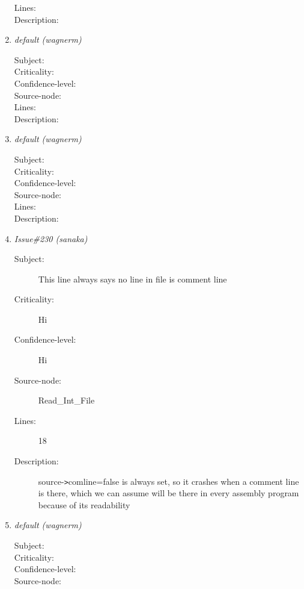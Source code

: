 \begin{enumerate}
\begin{description}
\item [Lines:] 

\item [Description:] 
\end{description}
\item {\it default (wagnerm)}
\begin{description}
\item [Subject:] 
\item [Criticality:] 
\item [Confidence-level:] 
\item [Source-node:] 

\item [Lines:] 

\item [Description:] 
\end{description}
\item {\it default (wagnerm)}
\begin{description}
\item [Subject:] 
\item [Criticality:] 
\item [Confidence-level:] 
\item [Source-node:] 

\item [Lines:] 

\item [Description:] 
\end{description}
\item {\it Issue\#230 (sanaka)}
\begin{description}
\item [Subject:] This line always says no line in file is comment line
\item [Criticality:] Hi
\item [Confidence-level:] Hi
\item [Source-node:] Read\_Int\_File

\item [Lines:] 18

\item [Description:] source-{\tt >}comline=false is always set, so it
crashes when a comment line is there, which we can assume will be there in
every assembly program because of its readability
\end{description}
\item {\it default (wagnerm)}
\begin{description}
\item [Subject:] 
\item [Criticality:] 
\item [Confidence-level:] 
\item [Source-node:] 


\end{description}
\end{enumerate}
